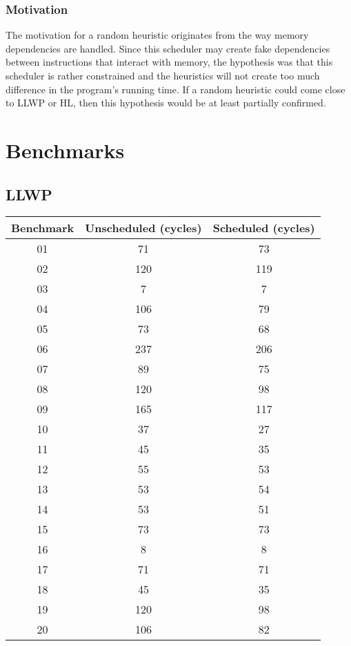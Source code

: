 \documentclass{article}
\begin{document}
\subsubsection{Motivation}
The motivation for a random heuristic originates from the way memory dependencies are handled. Since this scheduler may create fake dependencies between instructions that interact with memory, the hypothesis was that this scheduler is rather constrained and the heuristics will not create too much difference in the program's running time. If a random heuristic could come close to LLWP or HL, then this hypothesis would be at least partially confirmed.

\section{Benchmarks}
\subsection{LLWP}
\begin{center}
    \begin{tabular} {|c | c | c|}
        \hline
        Benchmark & Unscheduled (cycles)  & Scheduled (cycles) \\ \hline \hline
        01 & 71 & 73 \\ \hline
        02 & 120 & 119 \\ \hline
        03 & 7 & 7 \\ \hline
        04 & 106 & 79 \\ \hline
        05 & 73 & 68 \\ \hline
        06 & 237 & 206 \\ \hline
        07 & 89 & 75 \\ \hline
        08 & 120 & 98 \\ \hline
        09 & 165 & 117 \\ \hline
        10 & 37 & 27 \\ \hline
        11 & 45 & 35 \\ \hline
        12 & 55 & 53 \\ \hline
        13 & 53 & 54 \\ \hline
        14 & 53 & 51 \\ \hline
        15 & 73 & 73 \\ \hline
        16 & 8 & 8 \\ \hline
        17 & 71 & 71 \\ \hline
        18 & 45 & 35 \\ \hline
        19 & 120 & 98 \\ \hline
        20 & 106 & 82 \\ 
        \hline
    \end{tabular}
\end{center}
\end{document}
